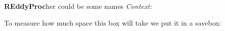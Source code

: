 
  {\vspace{.2cm}\textbf{REddyProc}\hfill\normalsize{her could be some names}}
\alert{\textit{Context:}}

To measure how much space this box will take we put it in a 
savebox:

